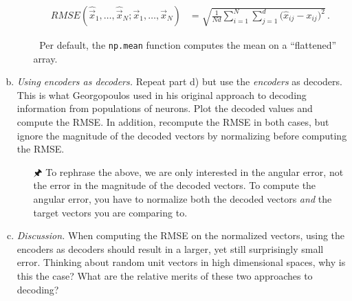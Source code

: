 \begin{enumerate}[a)]
\begin{itemize}
\begin{align*}
				\mathit{RMSE}(\hat{\vec x}_1, \ldots, \hat{\vec x}_N; \vec x_1, \ldots, \vec x_N)
					&= \sqrt{ \frac{1}{Nd} \sum_{i=1}^N \sum_{j=1}^d \big({\hat x}_{i j} - x_{ij}\big)^2 } \,.
			\end{align*}
			\item[{\symbolfont 🐍}] Per default, the \texttt{np.mean} function computes the mean on a \enquote{flattened} array.
		\end{itemize}
		\item {} \textit{Using encoders as decoders.} Repeat part d) but use the \textit{encoders} as decoders. This is what Georgopoulos used in his original approach to decoding information from populations of neurons. Plot the decoded values and compute the RMSE. In addition, recompute the RMSE in both cases, but ignore the magnitude of the decoded vectors by normalizing before computing the RMSE.
		\begin{itemize}
			\item[{\symbolfont 🖈}] To rephrase the above, we are only interested in the angular error, not the error in the magnitude of the decoded vectors. To compute the angular error, you have to normalize both the decoded vectors \emph{and} the target vectors you are comparing to.
		\end{itemize}
		\item {} \textit{Discussion.} When computing the RMSE on the normalized vectors, using the encoders as decoders should result in a larger, yet still surprisingly small error. Thinking about random unit vectors in high dimensional spaces, why is this the case? What are the relative merits of these two approaches to decoding?
	\end{enumerate}


